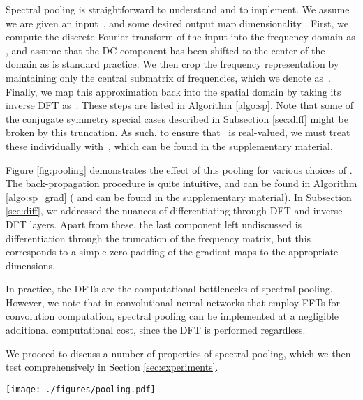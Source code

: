 \documentclass{article} \usepackage{nips15submit_e,times}
\begin{document}
Spectral pooling is straightforward to understand and to implement. We assume we are given an input~, and some desired output map dimensionality . First, we compute the discrete Fourier transform of the input into the frequency domain as , and assume that the DC component has been shifted to the center of the domain as is standard practice. We then crop the frequency representation by maintaining only the central  submatrix of frequencies, which we denote as~.  Finally, we map this approximation back into the spatial domain by taking its inverse DFT as~.  These steps are listed in Algorithm \ref{algo:sp}.  Note that some of the conjugate symmetry special cases described in Subsection \ref{sec:diff} might be broken by this truncation. As such, to ensure that~ is real-valued, we must treat these individually with~, which can be found in the supplementary material. 

Figure \ref{fig:pooling} demonstrates the effect of this pooling for various choices of . The back-propagation procedure is quite intuitive, and can be found in Algorithm \ref{algo:sp_grad} ( and  can be found in the supplementary material). In Subsection \ref{sec:diff}, we addressed the nuances of differentiating through DFT and inverse DFT layers. Apart from these, the last component left undiscussed is differentiation through the truncation of the frequency matrix, but this corresponds to a simple zero-padding of the gradient maps to the appropriate dimensions.

In practice, the DFTs are the computational bottlenecks of spectral pooling. However, we note that in convolutional neural networks that employ FFTs for convolution computation, spectral pooling can be implemented at a negligible additional computational cost, since the DFT is performed regardless.

We proceed to discuss a number of properties of spectral pooling, which we then test comprehensively in Section \ref{sec:experiments}.

\begin{figure*}[t]
\centering \texttt{[image: ./figures/pooling.pdf]}\caption{Approximations for different pooling schemes, for different factors of dimensionality reduction. Spectral pooling projects onto the Fourier basis and truncates it as desired. This retains significantly more information and permits the selection of any arbitrary output map dimensionality.}

\label{fig:pooling}
\end{figure*}
\end{document}
